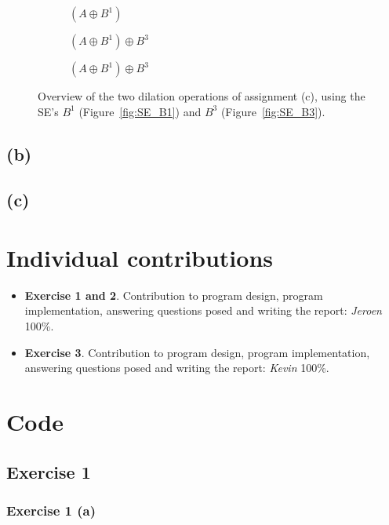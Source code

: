 \documentclass{article}
\begin{document}
\begin{figure}[H]
     \centering
     \begin{subfigure}[b]{0.3\textwidth}
         \centering
         
         \caption{$(A \oplus B^1)$}
         \label{fig:wirebondmask_Bcross_dilated}
     \end{subfigure}
     \hfill
     \begin{subfigure}[b]{0.3\textwidth}
         \centering
         
         \caption{$(A \oplus B^1) \oplus B^3$}
         \label{fig:wirebondmask_Bsquare_dilated}
     \end{subfigure}
     \hfill
     \begin{subfigure}[b]{0.3\textwidth}
         \centering
         
         \caption{$(A \oplus B^1) \oplus B^3$}
         \label{fig:wirebondmask_Bbigsquare_dilated}
     \end{subfigure}
     
    \caption{Overview of the two dilation operations of assignment (c), using the SE's $B^1$ (Figure~\ref{fig:SE_B1}) and $B^3$ (Figure~\ref{fig:SE_B3}).}
    \label{fig:wirebondmask_dilated}
\end{figure}

\subsection*{(b)}
\subsection*{(c)}

\section*{Individual contributions}
\begin{itemize}
    \item \textbf{Exercise 1 and 2}. Contribution to program design, program implementation, answering questions posed and writing the report: \textit{Jeroen} 100\%.
    \item \textbf{Exercise 3}. Contribution to program design, program implementation, answering questions posed and writing the report: \textit{Kevin} 100\%.
\end{itemize}


\typeout{}


\newpage
\appendix
\section{Code}
\subsection{Exercise 1}
\subsubsection{Exercise 1 (a)}
\end{document}
